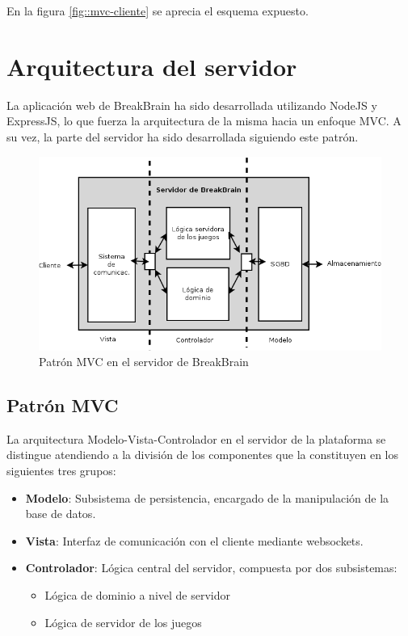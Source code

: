 En la figura \ref{fig::mvc-cliente} se aprecia el esquema expuesto.

\section{Arquitectura del servidor}

La aplicación web de BreakBrain ha sido desarrollada utilizando NodeJS y ExpressJS, lo que fuerza la arquitectura de la misma hacia un enfoque \acf{MVC}. A su vez, la parte del servidor ha sido desarrollada siguiendo este patrón.

\begin{figure}[H]
  \begin{center}
    \includegraphics[width=\textwidth]{images/mvc-servidor.png}
    \caption{Patrón MVC en el servidor de BreakBrain}
    \label{fig::mvc-servidor}
  \end{center}
\end{figure}

\subsection{Patrón MVC}

La arquitectura Modelo-Vista-Controlador en el servidor de la plataforma se distingue atendiendo a la división de los componentes que la constituyen en los siguientes tres grupos:

\begin{itemize}
\item {\bf Modelo}: Subsistema de persistencia, encargado de la manipulación de la base de datos.
\item {\bf Vista}: Interfaz de comunicación con el cliente mediante websockets.
\item {\bf Controlador}: Lógica central del servidor, compuesta por dos subsistemas:

  \begin{itemize}
  \item Lógica de dominio a nivel de servidor
  \item Lógica de servidor de los juegos
  \end{itemize}
\end{itemize}

